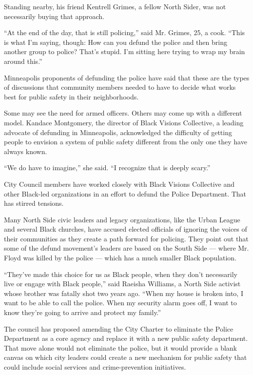 Standing nearby, his friend Kentrell Grimes, a fellow North Sider, was
not necessarily buying that approach.

``At the end of the day, that is still policing,'' said Mr. Grimes, 25,
a cook. ``This is what I'm saying, though: How can you defund the police
and then bring another group to police? That's stupid. I'm sitting here
trying to wrap my brain around this.''

Minneapolis proponents of defunding the police have said that these are
the types of discussions that community members needed to have to decide
what works best for public safety in their neighborhoods.

Some may see the need for armed officers. Others may come up with a
different model. Kandace Montgomery, the director of Black Visions
Collective, a leading advocate of defunding in Minneapolis, acknowledged
the difficulty of getting people to envision a system of public safety
different from the only one they have always known.

``We do have to imagine,'' she said. ``I recognize that is deeply
scary.''

City Council members have worked closely with Black Visions Collective
and other Black-led organizations in an effort to defund the Police
Department. That has stirred tensions.

Many North Side civic leaders and legacy organizations, like the Urban
League and several Black churches, have accused elected officials of
ignoring the voices of their communities as they create a path forward
for policing. They point out that some of the defund movement's leaders
are based on the South Side --- where Mr. Floyd was killed by the police
--- which has a much smaller Black population.

``They've made this choice for us as Black people, when they don't
necessarily live or engage with Black people,'' said Raeisha Williams, a
North Side activist whose brother was fatally shot two years ago. ``When
my house is broken into, I want to be able to call the police. When my
security alarm goes off, I want to know they're going to arrive and
protect my family.''

The council has proposed amending the City Charter to eliminate the
Police Department as a core agency and replace it with a new public
safety department. That move alone would not eliminate the police, but
it would provide a blank canvas on which city leaders could create a new
mechanism for public safety that could include social services and
crime-prevention initiatives.

